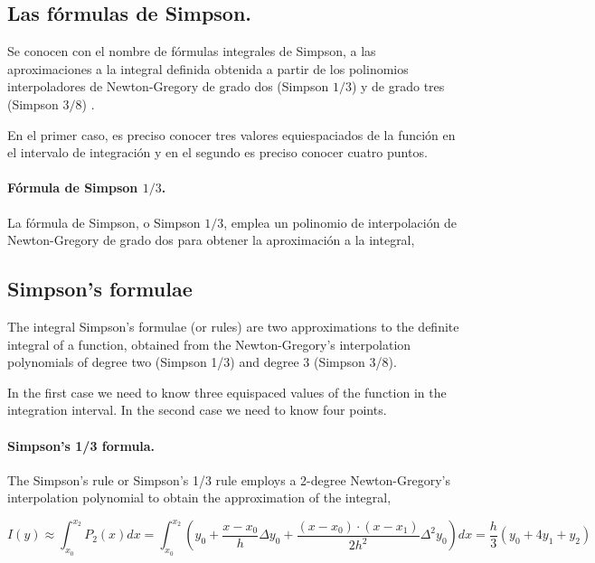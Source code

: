 \begin{paracol}{2}
\subsection{Las fórmulas de Simpson.}
Se conocen con el nombre de fórmulas integrales de Simpson, a las aproximaciones a la integral definida obtenida a partir de los polinomios interpoladores de Newton-Gregory de grado dos (Simpson $1/3$) y de grado tres (Simpson $3/8$) . 

En el primer caso, es preciso conocer tres valores equiespaciados de la función en el intervalo de integración y en el segundo es preciso conocer cuatro puntos. 

\paragraph*{Fórmula de Simpson $1/3$.} La fórmula de Simpson, o Simpson $1/3$,  emplea un polinomio de interpolación de Newton-Gregory de grado dos para  obtener la aproximación a la integral,

\switchcolumn
\subsection{Simpson's formulae}
The integral Simpson's formulae (or rules) are two approximations to the definite integral of a function, obtained from the Newton-Gregory's interpolation polynomials of degree two (Simpson 1/3) and degree 3 (Simpson 3/8).

In the first case we need to know three equispaced values of the function in the integration interval. In the second case we need to know four points.

\paragraph{Simpson's 1/3 formula.} The Simpson's rule or Simpson's 1/3 rule employs a 2-degree Newton-Gregory's interpolation polynomial to obtain the approximation of the integral, 
\end{paracol}
\begin{equation*}
I(y)\approx \int_{x_0}^{x_2}P_2(x)dx=\int_{x_0}^{x_2}\left(y_0+\frac{x-x_0}{h}\Delta y_0+\frac{(x-x_0)\cdot(x-x_1)}{2h^2}\Delta^2 y_0 \right)dx= \frac{h}{3}(y_0+4y_1+y_2)
\end{equation*}

